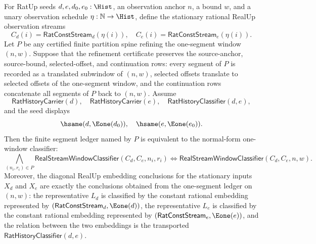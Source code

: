 \begin{theorem}
\label{thm:real-completeness-stationary-partition-normal-form}
For RatUp seeds $d,e,d_0,e_0:\Hist$, an observation anchor $n$, a bound $w$,
and a unary observation schedule $\eta:\mathbb{N}\to\Hist$, define the
stationary rational RealUp observation streams
$$
C_d(i)=\mathsf{RatConstStream}_d(\eta(i)),
\quad
C_e(i)=\mathsf{RatConstStream}_e(\eta(i)).
$$
Let $P$ be any certified finite partition spine refining the one-segment
window $(n,w)$. Suppose that the refinement certificate preserves the
source-anchor, source-bound, selected-offset, and continuation rows: every
segment of $P$ is recorded as a translated subwindow of $(n,w)$, selected
offsets translate to selected offsets of the one-segment window, and the
continuation rows concatenate all segments of $P$ back to $(n,w)$.
Assume
$$
\mathsf{RatHistoryCarrier}(d),\quad
\mathsf{RatHistoryCarrier}(e),\quad
\mathsf{RatHistoryClassifier}(d,e),
$$
and the seed displays
$$
\hsame(d,\Eone(d_0)),\quad
\hsame(e,\Eone(e_0)).
$$
Then the finite segment ledger named by $P$ is equivalent to the normal-form
one-window classifier:
$$
\bigwedge_{(n_i,r_i)\in P}
\mathsf{RealStreamWindowClassifier}(C_d,C_e,n_i,r_i)
\Longleftrightarrow
\mathsf{RealStreamWindowClassifier}(C_d,C_e,n,w).
$$
Moreover, the diagonal RealUp embedding conclusions for the stationary inputs
$X_d$ and $X_e$ are exactly the conclusions obtained from the one-segment
ledger on $(n,w)$: the representative $L_d$ is classified by the constant
rational embedding represented by
$(\mathsf{RatConstStream}_d,\Eone(d))$, the representative $L_e$ is classified
by the constant rational embedding represented by
$(\mathsf{RatConstStream}_e,\Eone(e))$, and the relation between the two
embeddings is the transported $\mathsf{RatHistoryClassifier}(d,e)$.
\end{theorem}


